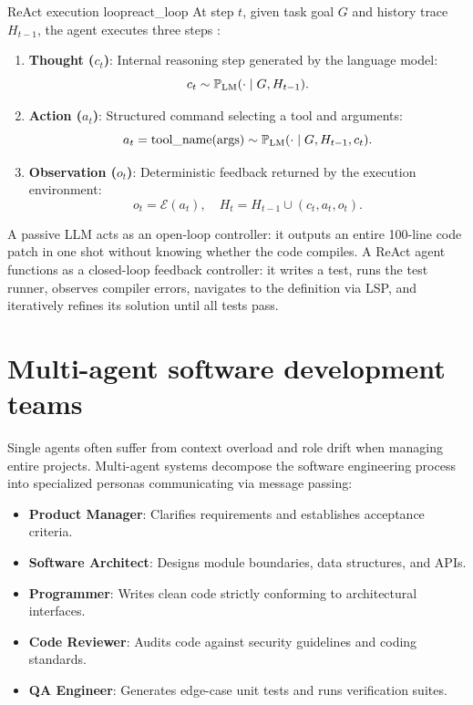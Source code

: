 \documentclass[../../main.tex]{subfiles}
\begin{document}
\begin{definition}{ReAct execution loop}{react_loop}
At step $t$, given task goal $G$ and history trace $H_{t-1}$, the agent executes three steps \citep{yao2022react}:
\begin{enumerate}
    \item \textbf{Thought ($c_t$)}: Internal reasoning step generated by the language model:
    \begin{equation}
    c_t \sim \mathbb{P}_{\text{LM}}(\cdot \mid G, H_{t-1}).
    \end{equation}
    \item \textbf{Action ($a_t$)}: Structured command selecting a tool and arguments:
    \begin{equation}
    a_t = \text{tool\_name}(\text{args}) \sim \mathbb{P}_{\text{LM}}(\cdot \mid G, H_{t-1}, c_t).
    \end{equation}
    \item \textbf{Observation ($o_t$)}: Deterministic feedback returned by the execution environment:
    \begin{equation}
    o_t = \mathcal{E}(a_t), \quad H_t = H_{t-1} \cup (c_t, a_t, o_t).
    \end{equation}
\end{enumerate}
\end{definition}

\begin{intuition}
A passive LLM acts as an open-loop controller: it outputs an entire 100-line code patch in one shot without knowing whether the code compiles. A ReAct agent functions as a closed-loop feedback controller: it writes a test, runs the test runner, observes compiler errors, navigates to the definition via LSP, and iteratively refines its solution until all tests pass.
\end{intuition}

\section{Multi-agent software development teams}
Single agents often suffer from context overload and role drift when managing entire projects. Multi-agent systems decompose the software engineering process into specialized personas communicating via message passing:
\begin{itemize}
    \item \textbf{Product Manager}: Clarifies requirements and establishes acceptance criteria.
    \item \textbf{Software Architect}: Designs module boundaries, data structures, and APIs.
    \item \textbf{Programmer}: Writes clean code strictly conforming to architectural interfaces.
    \item \textbf{Code Reviewer}: Audits code against security guidelines and coding standards.
    \item \textbf{QA Engineer}: Generates edge-case unit tests and runs verification suites.
\end{itemize}
\end{document}
